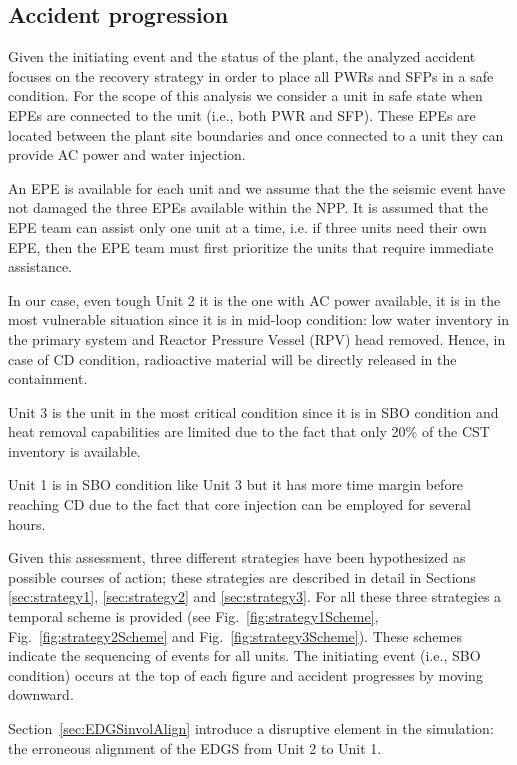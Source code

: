 \subsection{Accident progression}
\label{sec:accidentProgression}

Given the initiating event and the status of the plant, the analyzed accident focuses on the recovery strategy 
in order to place all PWRs and SFPs in a safe condition. For the scope of this analysis we consider a unit in
safe state when EPEs are connected to the unit (i.e., both PWR and SFP). These EPEs 
are located between the plant site boundaries and once connected to a unit they can provide AC power and water injection.

An EPE is available for each unit and we assume that the the seismic event have not damaged the three EPEs available 
within the NPP. It is assumed that the EPE team can assist only one unit at a time, i.e. if three units need their 
own EPE, then the EPE team must first prioritize the units that require immediate assistance.
  
In our case, even tough Unit 2 it is the one with AC power available, it is in the most vulnerable situation since it 
is in mid-loop condition: low water inventory in the primary system and Reactor Pressure Vessel (RPV) head removed. 
Hence, in case of
CD condition, radioactive material will be directly released in the containment.

Unit 3 is the unit in the most critical condition since it is in SBO condition and heat removal capabilities are limited
due to the fact that only 20\% of the CST inventory is available.

Unit 1 is in SBO condition like Unit 3 but it has more time margin before reaching CD due to the fact that core injection 
can be employed for several hours.

Given this assessment, three different strategies have been hypothesized as possible courses of action; these strategies
are described in detail in Sections \ref{sec:strategy1}, \ref{sec:strategy2} and \ref{sec:strategy3}.
For all these three strategies a temporal scheme is provided (see Fig.~\ref{fig:strategy1Scheme}, 
Fig.~\ref{fig:strategy2Scheme} and Fig.~\ref{fig:strategy3Scheme}). These schemes indicate the sequencing of events 
for all units. The initiating event (i.e., SBO condition) occurs at the top of each figure and accident progresses 
by moving downward.

Section~\ref{sec:EDGSinvolAlign} introduce a disruptive element in the simulation: the erroneous alignment of the EDGS
from Unit 2 to Unit 1.


